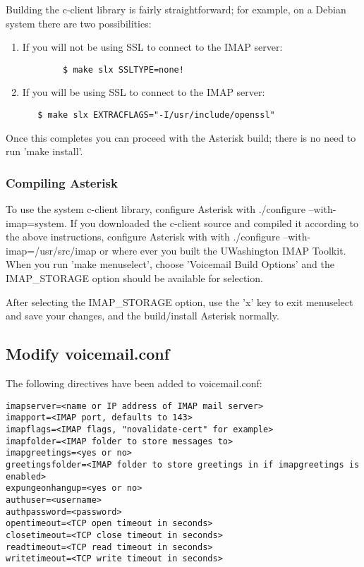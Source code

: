 Building the c-client library is fairly straightforward; for example, on a
Debian system there are two possibilities:

\begin{enumerate}
    \item If you will not be using SSL to connect to the IMAP server:
   \begin{verbatim}
        $ make slx SSLTYPE=none!
   \end{verbatim}
    \item If you will be using SSL to connect to the IMAP server:
   \begin{verbatim}
   $ make slx EXTRACFLAGS="-I/usr/include/openssl"
   \end{verbatim}
\end{enumerate}

Once this completes you can proceed with the Asterisk build; there is no
need to run 'make install'.

\subsubsection{Compiling Asterisk}

To use the system c-client library, configure Asterisk with
./configure --with-imap=system. If you downloaded the c-client source
and compiled it according to the above instructions, configure
Asterisk with with ./configure --with-imap=/usr/src/imap or where ever
you built the UWashington IMAP Toolkit. When you run 'make
menuselect', choose 'Voicemail Build Options' and the IMAP\_STORAGE
option should be available for selection.

After selecting the IMAP\_STORAGE option, use the 'x' key to exit
menuselect and save your changes, and the build/install Asterisk
normally.

\subsection{Modify voicemail.conf}

The following directives have been added to voicemail.conf:
\begin{astlisting}
\begin{verbatim}
imapserver=<name or IP address of IMAP mail server>
imapport=<IMAP port, defaults to 143>
imapflags=<IMAP flags, "novalidate-cert" for example>
imapfolder=<IMAP folder to store messages to>
imapgreetings=<yes or no>
greetingsfolder=<IMAP folder to store greetings in if imapgreetings is enabled>
expungeonhangup=<yes or no>
authuser=<username>
authpassword=<password>
opentimeout=<TCP open timeout in seconds>
closetimeout=<TCP close timeout in seconds>
readtimeout=<TCP read timeout in seconds>
writetimeout=<TCP write timeout in seconds>
\end{verbatim}
\end{astlisting}

